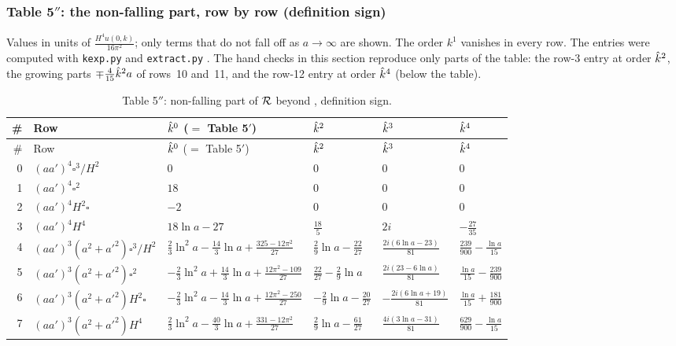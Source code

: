 \subsubsection{Table 5\texorpdfstring{$''$}{''}: the non-falling part, row by row (definition sign)}
Values in units of $\frac{H^4u(0,k)}{16\pi^2}$; only terms that do not fall off as $a\to\infty$ are shown. The order $k^1$ vanishes in every row.
The entries were computed with \texttt{kexp.py} and \texttt{extract.py} \tC. The hand checks in this section reproduce only parts of the table: the row-3 entry at order $\hat k^2$, the growing parts $\mp\tfrac4{15}\hat k^2a$ of rows~10 and~11, and the row-12 entry at order $\hat k^4$ (below the table).

{\small\renewcommand{\arraystretch}{1.3}
\setlength{\tabcolsep}{4pt}
\begin{longtable}{@{}r l l l l l@{}}
\caption{Table 5$''$: non-falling part of $\mathcal{R}$ beyond , definition sign.}\label{tab:ch09-t5pp}\\
\toprule
\# & Row & $\hat k^0$ ($=$ Table 5$'$) & $\hat k^2$ & $\hat k^3$ & $\hat k^4$\\
\midrule
\endfirsthead
\toprule
\# & Row & $\hat k^0$ ($=$ Table 5$'$) & $\hat k^2$ & $\hat k^3$ & $\hat k^4$\\
\midrule
\endhead
0 & $(aa')^4\square^3/H^2$ & 0 & 0 & 0 & 0\\
1 & $(aa')^4\square^2$ & $18$ & 0 & 0 & 0\\
2 & $(aa')^4H^2\square$ & $-2$ & 0 & 0 & 0\\
3 & $(aa')^4H^4$ & $18\ln a-27$ & $\tfrac{18}5$ & $2i$ & $-\tfrac{27}{35}$\\[2pt]
4 & $(aa')^3(a^2{+}a'^2)\square^3/H^2$ & $\tfrac23\ln^2a-\tfrac{14}3\ln a+\tfrac{325-12\pi^2}{27}$ & $\tfrac29\ln a-\tfrac{22}{27}$ & $\tfrac{2i(6\ln a-23)}{81}$ & $\tfrac{239}{900}-\tfrac{\ln a}{15}$\\[2pt]
5 & $(aa')^3(a^2{+}a'^2)\square^2$ & $-\tfrac23\ln^2a+\tfrac{14}3\ln a+\tfrac{12\pi^2-109}{27}$ & $\tfrac{22}{27}-\tfrac29\ln a$ & $\tfrac{2i(23-6\ln a)}{81}$ & $\tfrac{\ln a}{15}-\tfrac{239}{900}$\\[2pt]
6 & $(aa')^3(a^2{+}a'^2)H^2\square$ & $-\tfrac23\ln^2a-\tfrac{14}3\ln a+\tfrac{12\pi^2-250}{27}$ & $-\tfrac29\ln a-\tfrac{20}{27}$ & $-\tfrac{2i(6\ln a+19)}{81}$ & $\tfrac{\ln a}{15}+\tfrac{181}{900}$\\[2pt]
7 & $(aa')^3(a^2{+}a'^2)H^4$ & $\tfrac23\ln^2a-\tfrac{40}3\ln a+\tfrac{331-12\pi^2}{27}$ & $\tfrac29\ln a-\tfrac{61}{27}$ & $\tfrac{4i(3\ln a-31)}{81}$ & $\tfrac{629}{900}-\tfrac{\ln a}{15}$\\[2pt]

\end{longtable}}
